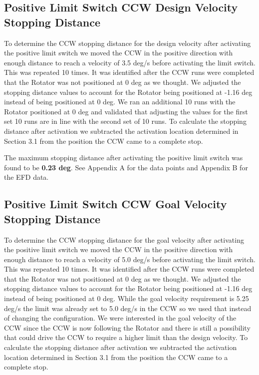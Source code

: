 \documentclass[SE,lsstdraft,authoryear,toc]{lsstdoc}
\begin{document}
\subsection{Positive Limit Switch CCW Design Velocity Stopping Distance}

To determine the CCW stopping distance for the design velocity after
activating the positive limit switch we moved the CCW in the positive
direction with enough distance to reach a velocity of 3.5 deg/s before
activating the limit switch. This was repeated 10 times. It was
identified after the CCW runs were completed that the Rotator was not
positioned at 0 deg as we thought. We adjusted the stopping distance
values to account for the Rotator being positioned at -1.16 deg instead
of being positioned at 0 deg. We ran an additional 10 runs with the
Rotator positioned at 0 deg and validated that adjusting the values for
the first set 10 runs are in line with the second set of 10 runs. To
calculate the stopping distance after activation we subtracted the
activation location determined in Section 3.1 from the position the CCW
came to a complete stop.

The maximum stopping distance after activating the positive limit switch
was found to be \textbf{0.23 deg}. See Appendix A for the data points
and Appendix B for the EFD data.

\subsection{Positive Limit Switch CCW Goal Velocity Stopping Distance}

To determine the CCW stopping distance for the goal velocity after
activating the positive limit switch we moved the CCW in the positive
direction with enough distance to reach a velocity of 5.0 deg/s before
activating the limit switch. This was repeated 10 times. It was
identified after the CCW runs were completed that the Rotator was not
positioned at 0 deg as we thought. We adjusted the stopping distance
values to account for the Rotator being positioned at -1.16 deg instead
of being positioned at 0 deg. While the goal velocity requirement is
5.25 deg/s the limit was already set to 5.0 deg/s in the CCW so we used
that instead of changing the configuration. We were interested in the
goal velocity of the CCW since the CCW is now following the Rotator and
there is still a possibility that could drive the CCW to require a
higher limit than the design velocity. To calculate the stopping
distance after activation we subtracted the activation location
determined in Section 3.1 from the position the CCW came to a complete
stop.
\end{document}
